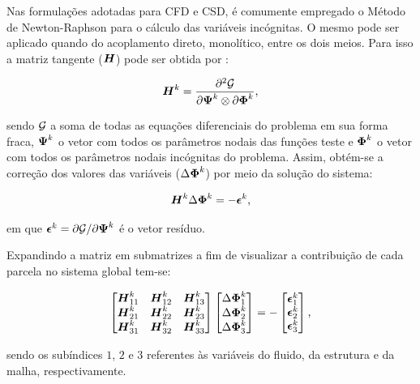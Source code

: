Nas formulações adotadas para CFD e CSD, é comumente empregado o Método de Newton-Raphson para o cálculo das variáveis incógnitas. O mesmo pode ser aplicado quando do acoplamento direto, monolítico, entre os dois meios. Para isso a matriz tangente ($\boldsymbol{H}$) pode ser obtida por \cite{bazilevs2013computational,sanches2022metodos}:

\begin{equation}
    \boldsymbol{H}^k=\frac{\partial^2\mathcal{G}}{\partial\boldsymbol{\Psi}^k\otimes\partial\boldsymbol{\Phi}^k}\text{,}
\end{equation}

\noindent sendo $\mathcal{G}$ a soma de todas as equações diferenciais do problema em sua forma fraca, $\boldsymbol{\Psi}^k$ o vetor com todos os parâmetros nodais das funções teste e $\boldsymbol{\Phi}^k$ o vetor com todos os parâmetros nodais incógnitas do problema. Assim, obtém-se a correção dos valores das variáveis ($\Delta\boldsymbol{\Phi}^k$) por meio da solução do sistema:

\begin{equation}
    \boldsymbol{H}^k\Delta\boldsymbol{\Phi}^k=-\boldsymbol{\epsilon}^k\text{,}
\end{equation}

\noindent em que $\boldsymbol{\epsilon}^k=\partial\mathcal{G}/\partial\boldsymbol{\Psi}^k$ é o vetor resíduo.

Expandindo a matriz em submatrizes a fim de visualizar a contribuição de cada parcela no sistema global tem-se:

\begin{equation}
    \begin{bmatrix}
        \boldsymbol{H}_{11}^k & \boldsymbol{H}_{12}^k & \boldsymbol{H}_{13}^k \\
        \boldsymbol{H}_{21}^k & \boldsymbol{H}_{22}^k & \boldsymbol{H}_{23}^k \\
        \boldsymbol{H}_{31}^k & \boldsymbol{H}_{32}^k & \boldsymbol{H}_{33}^k
    \end{bmatrix}\begin{bmatrix}
        \Delta\boldsymbol{\Phi}_1^k \\\Delta\boldsymbol{\Phi}_2^k\\\Delta\boldsymbol{\Phi}_3^k
    \end{bmatrix}=-\begin{bmatrix}
        \boldsymbol{\epsilon}_1^k \\\boldsymbol{\epsilon}_2^k\\\boldsymbol{\epsilon}_3^k
    \end{bmatrix}\text{,}
\end{equation}

\noindent sendo os subíndices $1$, $2$ e $3$ referentes às variáveis do fluido, da estrutura e da malha, respectivamente.

